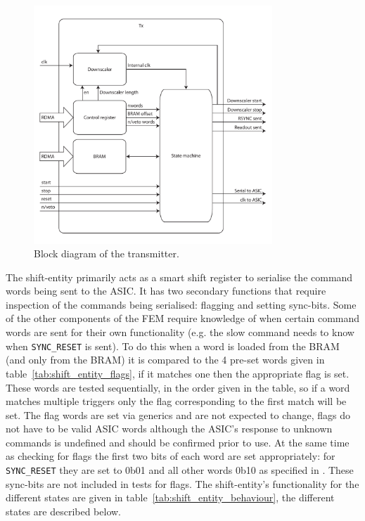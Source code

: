 \begin{figure}[htbp]
  \centering
  \includegraphics[width=0.8\textwidth]{images/pdfs/tx_block.pdf}
  \caption{Block diagram of the transmitter.}
  \label{fig:tx_entity}
\end{figure}
        
The shift-entity primarily acts as a smart shift register to serialise the command words being sent to the ASIC. It has two secondary functions that require inspection of the commands being serialised: flagging and setting sync-bits. Some of the other components of the FEM require knowledge of when certain command words are sent for their own functionality (e.g. the slow command needs to know when \texttt{SYNC\_RESET} is sent). To do this when a word is loaded from the BRAM (and only from the BRAM) it is compared to the 4 pre-set words given in table~\ref{tab:shift_entity_flags}, if it matches one then the appropriate flag is set. These words are tested sequentially, in the order given in the table, so if a word matches multiple triggers only the flag corresponding to the first match will be set. The flag words are set via generics and are not expected to change, flags do not have to be valid ASIC words although the ASIC's response to unknown commands is undefined and should be confirmed prior to use. At the same time as checking for flags the first two bits of each word are set appropriately: for \texttt{SYNC\_RESET} they are set to 0b01 and all other words 0b10 as specified in \cite{lpd_manual}. These sync-bits are not included in tests for flags. The shift-entity's functionality for the different states are given in table~\ref{tab:shift_entity_behaviour}, the different states are described below.

